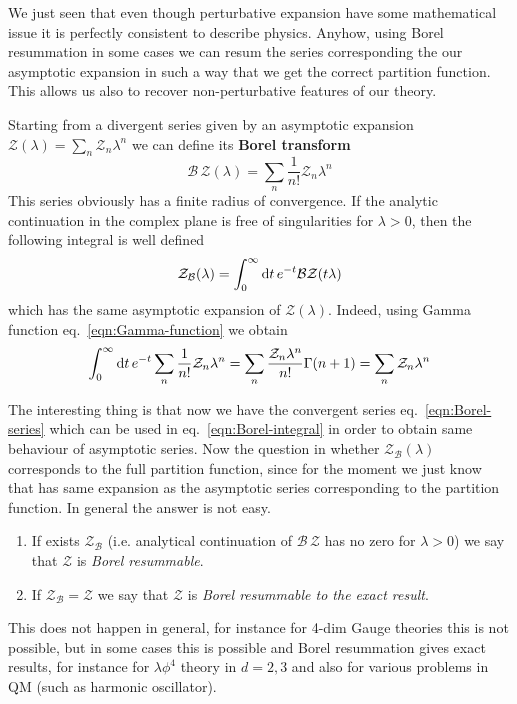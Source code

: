 \documentclass[../main/main.tex]{subfiles}
\begin{document}
We just seen that even though perturbative expansion have some mathematical issue it is perfectly consistent to describe physics. Anyhow, using Borel resummation in some cases we can resum the series corresponding the our asymptotic expansion in such a way that we get the correct partition function. This allows us also to recover non-perturbative features of our theory. 

Starting from a divergent series given by an asymptotic expansion $\mathcal Z(\lambda)=\sum_n\mathcal Z_n\lambda^n$ we can define its \textbf{Borel transform} 
\begin{equation}\label{eqn:Borel-series}
\mathcal B\,\mathcal Z(\lambda)=\sum_n\frac1{n!}\mathcal Z_n\lambda^n
\end{equation}
This series obviously has a finite radius of convergence. If the analytic continuation in the complex plane is free of singularities for $\lambda>0$, then the following integral is well defined
\begin{equation}\label{eqn:Borel-integral}
\mathcal Z_{\mathcal B}(\lambda)=\int_0^\infty\textup{d} t\, e^{-t}\mathcal B\mathcal Z(t\lambda)
\end{equation}
which has the same asymptotic expansion of $\mathcal Z(\lambda)$. Indeed, using Gamma function eq.~\eqref{eqn:Gamma-function} we obtain
\[\int_0^\infty\textup{d} t\, e^{-t}\sum_n\frac1{n!}\mathcal Z_n\lambda^n
=\sum_n\frac{\mathcal Z_n\lambda^n}{n!}\Gamma(n+1)=\sum_n\mathcal Z_n\lambda^n\]

The interesting thing is that now we have the convergent series eq.~\eqref{eqn:Borel-series} which can be used in eq.~\eqref{eqn:Borel-integral} in order to obtain same behaviour of asymptotic series.
Now the question in whether $\mathcal Z_{\mathcal B}(\lambda)$ corresponds to the full partition function, since for the moment we just know that has same expansion as the asymptotic series corresponding to the partition function. In general the answer is not easy. 
\begin{enumerate}[label=\textbullet]
\item If exists $\mathcal Z_{\mathcal B}$ (i.e. analytical continuation of $\mathcal B\,\mathcal Z$ has no zero for $\lambda>0$) we say that $\mathcal Z$ is \emph{Borel resummable}.
\item If $\mathcal Z_{\mathcal B}=\mathcal Z$ we say that $\mathcal Z$ is \emph{Borel resummable to the exact result}.
\end{enumerate}
This does not happen in general, for instance for 4-dim Gauge theories this is not possible, but in some cases this is possible and Borel resummation gives exact results, for instance for $\lambda\phi^4$ theory in $d=2,3$ and also for various problems in QM (such as harmonic oscillator). 
\end{document}
